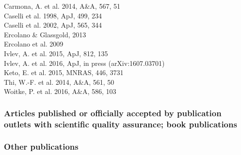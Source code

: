 \documentclass[10pt,fleqn,twoside]{article}
\newcommand{\Tcol}{\color{blue}}
\begin{document}
Carmona, A. et al. 2014, A\&A, 567, 51 \\
Caselli et al. 1998, ApJ, 499, 234 \\
Caselli et al. 2002, ApJ, 565, 344 \\
Ercolano \& Glassgold, 2013 \\
Ercolano et al. 2009 \\
Ivlev, A. et al. 2015, ApJ, 812, 135 \\
Ivlev, A. et al. 2016, ApJ, in press (arXiv:1607.03701) \\
Keto, E. et al. 2015, MNRAS, 446, 3731 \\
Thi, W.-F. et al. 2014, A\&A, 561, 50 \\
Woitke, P. et al. 2016, A\&A, 586, 103 \\

\subsubsection{\Tcol 
Articles published or officially accepted by publication outlets with scientific quality assurance;
book publications}

\subsubsection{\Tcol Other publications}
\end{document}
